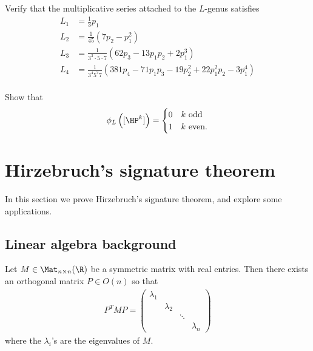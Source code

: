 \documentclass[11pt]{book}
\begin{document}
\begin{exercise}\label{exer:m-series-for-L-genus} 
Verify that the multiplicative series attached to the $L$-genus satisfies
\begin{align*}
    L_1 &= \frac{1}{3}p_1 \\
    L_2 &= \frac{1}{45}(7p_2-p_1^2) \\
    L_3 &= \frac{1}{3^3\cdot5\cdot 7} (62p_3 - 13p_1p_2 + 2p_1^3) \\
    L_4 &= \frac{1}{3^4 5^2 7} (381 p_4 - 71 p_1 p_3 - 19 p_2^2 + 22p_1^2 p_2 -3 p_1^4) \\
\end{align*}
\end{exercise}

\begin{exercise} Show that
\begin{align*}
    \phi_L \left( [\HP^k] \right) = \begin{cases} 0 & k\text{ odd} \\ 1 & k\text{ even.} \end{cases}
\end{align*}
\end{exercise}


\section{Hirzebruch's signature theorem}

In this section we prove Hirzebruch's signature theorem, and explore some applications.

\subsection{Linear algebra background}

\begin{theorem} Let $M\in \Mat_{n \times n}(\R)$ be a symmetric matrix with real entries. Then there exists an orthogonal matrix $P \in O(n)$ so that
\begin{align*}
    P^T M P = \begin{pmatrix} \lambda_1 \\ & \lambda_2 & \\
    & & \ddots  \\
    & & & \lambda_n\end{pmatrix} 
\end{align*}
where the $\lambda_i$'s are the eigenvalues of $M$.
\end{theorem}
\end{document}
